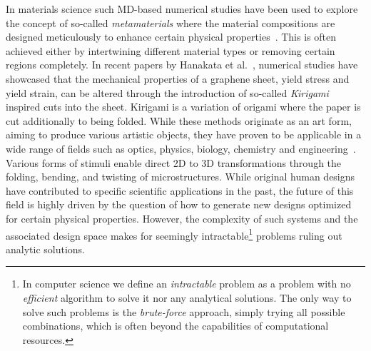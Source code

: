In materials science such \acrshort{MD}-based numerical studies have been used
to explore the concept of so-called \textit{metamaterials} where the material
compositions are designed meticulously to enhance certain physical
properties~\mbox{\cite{PhysRevLett.121.255304, PhysRevResearch.2.042006,
graphene/hBN, Mao, Yang, Forte}}. This is often achieved either by intertwining
different material types or removing certain regions completely. In recent
papers by Hanakata et al.~\cite{PhysRevLett.121.255304,
PhysRevResearch.2.042006}, numerical studies have showcased that the mechanical
properties of a graphene sheet, yield stress and yield strain, can be altered
through the introduction of so-called \textit{Kirigami} inspired cuts into the
sheet. Kirigami is a variation of origami where the paper is cut additionally to
being folded. While these methods originate as an art form, aiming to produce
various artistic objects, they have proven to be applicable in a wide range of
fields such as optics, physics, biology, chemistry and
engineering~\cite{chen_kirigamiorigami_2020}. Various forms of stimuli enable
direct 2D to 3D transformations through the folding, bending, and twisting of
microstructures. While original human designs have contributed to specific
scientific applications in the past, the future of this field is highly driven
by the question of how to generate new designs optimized for certain physical
properties. However, the complexity of such systems and the associated design
space makes for seemingly intractable\footnote{In computer science we define an
\textit{intractable} problem as a problem with no \textit{efficient} algorithm
to solve it nor any analytical solutions. The only way to solve such problems is
the \textit{brute-force} approach, simply trying all possible combinations, which
is often beyond the capabilities of computational resources.} problems ruling
out analytic solutions.

